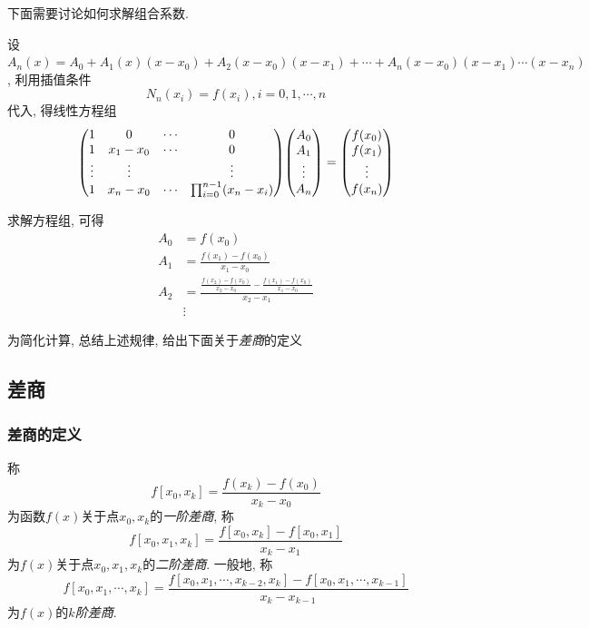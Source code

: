 下面需要讨论如何求解组合系数.

设$A_n(x)=A_0+A_1(x)(x-x_0)+A_2(x-x_0)(x-x_1)+\cdots+A_n(x-x_0)(x-x_1)\cdots(x-x_n)$, 利用插值条件
\begin{equation*}
    N_n(x_i)=f(x_i),i=0,1,\cdots,n
\end{equation*}
代入, 得线性方程组
\begin{equation*}
    \mqty(1&0&\cdots&0\\1&x_1-x_0&\cdots&0\\\vdots&\vdots&&\vdots\\1&x_n-x_0&\cdots&\prod_{i=0}^{n-1}(x_n-x_i))\mqty(A_0\\A_1\\\vdots\\A_n)=\mqty(f(x_0)\\f(x_1)\\\vdots\\f(x_n))
\end{equation*}

求解方程组, 可得
\begin{align*}
    A_0&=f(x_0)\\
    A_1&=\frac{f(x_1)-f(x_0)}{x_1-x_0}\\
    A_2&=\frac{\frac{f(x_2)-f(x_0)}{x_2-x_0}-\frac{f(x_1)-f(x_0)}{x_1-x_0}}{x_2-x_1}\\
    &\vdots
\end{align*}

为简化计算, 总结上述规律, 给出下面关于\emph{差商}的定义

\subsection{差商}

\subsubsection{差商的定义}

\begin{definition}[差商]
    称
    \begin{equation*}
        f[x_0,x_k] = \frac{f(x_k)-f(x_0)}{x_k-x_0}
    \end{equation*}
    为函数$f(x)$关于点$x_0,x_k$的\emph{一阶差商}, 称
    \begin{equation*}
        f[x_0,x_1,x_k]=\frac{f[x_0,x_k]-f[x_0,x_1]}{x_k-x_1}
    \end{equation*}
    为$f(x)$关于点$x_0,x_1,x_k$的\emph{二阶差商}. 一般地, 称
    \begin{equation*}
        f[x_0,x_1,\cdots,x_k]=\frac{f[x_0,x_1,\cdots,x_{k-2},x_k]-f[x_0,x_1,\cdots,x_{k-1}]}{x_k-x_{k-1}}
    \end{equation*}
    为$f(x)$的\emph{$k$阶差商}.
\end{definition}

